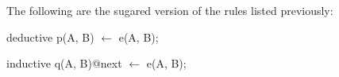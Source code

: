 
\begin{example}

The following are the sugared version of the rules listed previously:

\begin{Dedalus}
deductive
p(A, B) \(\leftarrow\)
  e(A, B);
  
inductive 
q(A, B)@next \(\leftarrow\)
  e(A, B);
  
    
\end{Dedalus}


\end{example}


% 
% 




%
%


